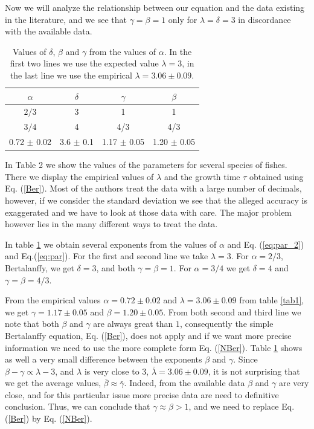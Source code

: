 \documentclass[12pt]{iopart}
\begin{document}
Now we will analyze the relationship between our equation and the data existing in the literature, and we see that $\gamma= \beta=1$ only for $\lambda=\delta=3$ in discordance with the available data.

\begin{table}
\centering
\begin{tabular}{|c|c|c|c|}
\hline
$\alpha$        & $\delta$   & $\gamma$   & $\beta$    \\
\hline
$2/3$       & 3          & 1          & 1          \\
$3/4$       & 4          & 4/3          & 4/3        \\
0.72 $\pm$ 0.02 & 3.6 $\pm$ 0.1& 1.17 $\pm$ 0.05& 1.20 $\pm$ 0.05\\
\hline
\end{tabular}
\caption{Values of $\delta$, $\beta$ and $\gamma$  from the values of  $\alpha$. In the first two lines we use the expected value $\lambda=3$, in the last line we use the empirical $\lambda=3.06 \pm 0.09$.}
\label{tablegamma}
\end{table}

In Table 2 we show the values of the parameters for several species of fishes. There we display the empirical values of $\lambda$ and the growth time $\tau$ obtained using  Eq. (\ref{Ber}). Most of the authors treat the data with a  large number of decimals, however,   if we consider the standard deviation we see that the alleged accuracy is exaggerated and we have to look at those data with care. The major problem however lies in the many different ways to treat the data.

In table \ref{tablegamma} we obtain several exponents from the values of $\alpha$ and Eq. (\ref{eq:par_2}) and Eq.(\ref{eq:par}).   For the first and second line we take $\lambda=3$. For $\alpha=2/3$, Bertalanffy, we get $\delta=3$, and both
$\gamma=\beta=1$. For $\alpha=3/4$  we get $\delta=4$ and  $\gamma=\beta=4/3$.

From the empirical values $\alpha=0.72 \pm 0.02$ and $\lambda=3.06 \pm 0.09$  from table  \ref{tab1}, we get $\gamma=1.17 \pm 0.05$ and $\beta=1.20 \pm 0.05$.
From both second and third line  we note that both $\beta$ and $\gamma$ are always great than $1$, consequently the simple Bertalanffy equation, Eq. (\ref{Ber}), does not apply and if we want more precise information we need to use the more complete form Eq. (\ref{NBer}). Table \ref{tablegamma} shows as well a very small difference between the exponents $\beta$ and  $\gamma$.   Since  $\beta-\gamma \propto \lambda-3$,  and  $\lambda$ is very close to $3$, $\bar{\lambda} = 3.06 \pm 0.09$,  it is not surprising that we get the average values,  $\bar{\beta} \approx \bar{\gamma}$. Indeed, from the available data $\beta$ and $\gamma$ are very close, and for this particular issue more precise data are need to definitive conclusion. Thus, we can conclude that $\gamma \approx \beta > 1$, and we need to replace  Eq. (\ref{Ber}) by Eq. (\ref{NBer}).
\end{document}
